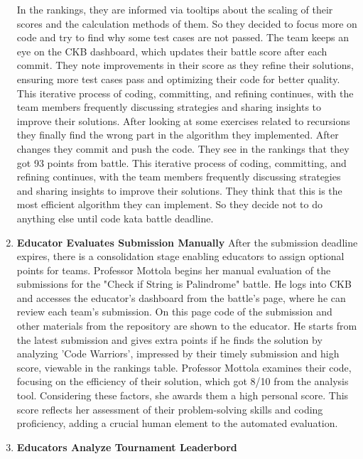 \begin{enumerate}
    In the rankings, they are informed via tooltips about the scaling of their scores and the calculation methods of them. So they decided to focus more on code and try to find why some test cases are not passed. The team keeps an eye on the CKB dashboard, which updates their battle score after each commit. They note improvements in their score as they refine their solutions, ensuring more test cases pass and optimizing their code for better quality. This iterative process of coding, committing, and refining continues, with the team members frequently discussing strategies and sharing insights to improve their solutions. After looking at some exercises related to recursions they finally find the wrong part in the algorithm they implemented. After changes they commit and push the code. They see in the rankings that they got 93 points from battle. This iterative process of coding, committing, and refining continues, with the team members frequently discussing strategies and sharing insights to improve their solutions. They think that this is the most efficient algorithm they can implement. So they decide not to do anything else until code kata battle deadline. \newline
    \item \textbf{Educator Evaluates Submission Manually} \newline
    After the submission deadline expires, there is a consolidation stage enabling educators to assign optional points for teams. Professor Mottola begins her manual evaluation of the submissions for the "Check if String is Palindrome" battle. He logs into CKB and accesses the educator's dashboard from the battle's page, where he can review each team's submission. On this page code of the submission and other materials from the repository are shown to the educator. He starts from the latest submission and gives extra points if he finds the solution by analyzing 'Code Warriors', impressed by their timely submission and high score, viewable in the rankings table. Professor Mottola examines their code, focusing on the efficiency of their solution, which got 8/10 from the analysis tool. Considering these factors, she awards them a high personal score. This score reflects her assessment of their problem-solving skills and coding proficiency, adding a crucial human element to the automated evaluation. 
    \item \textbf{Educators Analyze Tournament Leaderbord} \newline

\end{enumerate}
